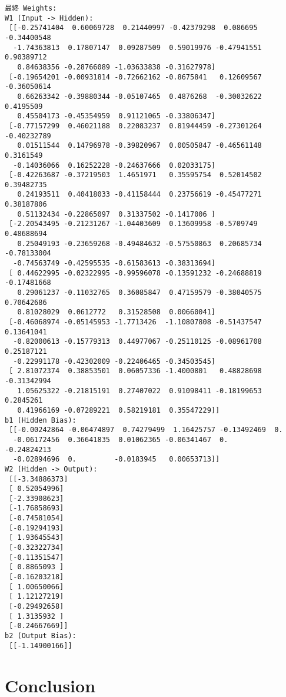 \documentclass[11pt]{article}
\begin{document}
    \begin{Verbatim}[commandchars=\\\{\}]
最終 Weights:
W1 (Input -> Hidden):
 [[-0.25741404  0.60069728  0.21440997 -0.42379298  0.086695   -0.34400548
  -1.74363813  0.17807147  0.09287509  0.59019976 -0.47941551  0.90389712
   0.84638356 -0.28766089 -1.03633838 -0.31627978]
 [-0.19654201 -0.00931814 -0.72662162 -0.8675841   0.12609567 -0.36050614
   0.66263342 -0.39880344 -0.05107465  0.4876268  -0.30032622  0.4195509
   0.45504173 -0.45354959  0.91121065 -0.33806347]
 [-0.77157299  0.46021188  0.22083237  0.81944459 -0.27301264 -0.40232789
   0.01511544  0.14796978 -0.39820967  0.00505847 -0.46561148  0.3161549
  -0.14036066  0.16252228 -0.24637666  0.02033175]
 [-0.42263687 -0.37219503  1.4651971   0.35595754  0.52014502  0.39482735
   0.24193511  0.40418033 -0.41158444  0.23756619 -0.45477271  0.38187806
   0.51132434 -0.22865097  0.31337502 -0.1417006 ]
 [-2.20543495 -0.21231267 -1.04403609  0.13609958 -0.5709749   0.48688694
   0.25049193 -0.23659268 -0.49484632 -0.57550863  0.20685734 -0.78133004
  -0.74563749 -0.42595535 -0.61583613 -0.38313694]
 [ 0.44622995 -0.02322995 -0.99596078 -0.13591232 -0.24688819 -0.17481668
   0.29061237 -0.11032765  0.36085847  0.47159579 -0.38040575  0.70642686
   0.81028029  0.0612772   0.31528508  0.00660041]
 [-0.46068974 -0.05145953 -1.7713426  -1.10807808 -0.51437547  0.13641041
  -0.82000613 -0.15779313  0.44977067 -0.25110125 -0.08961708  0.25187121
  -0.22991178 -0.42302009 -0.22406465 -0.34503545]
 [ 2.81072374  0.38853501  0.06057336 -1.4000801   0.48828698 -0.31342994
   1.05625322 -0.21815191  0.27407022  0.91098411 -0.18199653  0.2845261
   0.41966169 -0.07289221  0.58219181  0.35547229]]
b1 (Hidden Bias):
 [[-0.00242864 -0.06474897  0.74279499  1.16425757 -0.13492469  0.
  -0.06172456  0.36641835  0.01062365 -0.06341467  0.         -0.24824213
  -0.02894696  0.         -0.0183945   0.00653713]]
W2 (Hidden -> Output):
 [[-3.34886373]
 [ 0.52054996]
 [-2.33908623]
 [-1.76858693]
 [-0.74581054]
 [-0.19294193]
 [ 1.93645543]
 [-0.32322734]
 [-0.11351547]
 [ 0.8865093 ]
 [-0.16203218]
 [ 1.00650066]
 [ 1.12127219]
 [-0.29492658]
 [ 1.3135932 ]
 [-0.24667669]]
b2 (Output Bias):
 [[-1.14900166]]
    \end{Verbatim}

    \section{Conclusion}\label{conclusion}
\end{document}
